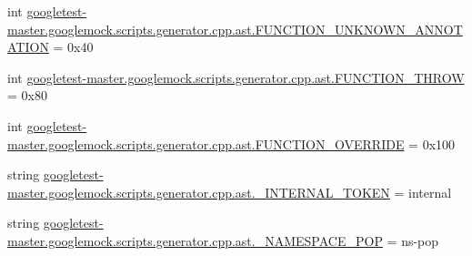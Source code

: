 \begin{DoxyCompactItemize}
\item 
int \mbox{\hyperlink{namespacegoogletest-master_1_1googlemock_1_1scripts_1_1generator_1_1cpp_1_1ast_a25e74e72724f3c7efddb6b23892fd223}{googletest-\/master.\+googlemock.\+scripts.\+generator.\+cpp.\+ast.\+F\+U\+N\+C\+T\+I\+O\+N\+\_\+\+U\+N\+K\+N\+O\+W\+N\+\_\+\+A\+N\+N\+O\+T\+A\+T\+I\+ON}} = 0x40
\item 
int \mbox{\hyperlink{namespacegoogletest-master_1_1googlemock_1_1scripts_1_1generator_1_1cpp_1_1ast_a104c6319c44299d684ee60c8d6879fde}{googletest-\/master.\+googlemock.\+scripts.\+generator.\+cpp.\+ast.\+F\+U\+N\+C\+T\+I\+O\+N\+\_\+\+T\+H\+R\+OW}} = 0x80
\item 
int \mbox{\hyperlink{namespacegoogletest-master_1_1googlemock_1_1scripts_1_1generator_1_1cpp_1_1ast_a9c16f7cb37a67b9647d0168f313fe338}{googletest-\/master.\+googlemock.\+scripts.\+generator.\+cpp.\+ast.\+F\+U\+N\+C\+T\+I\+O\+N\+\_\+\+O\+V\+E\+R\+R\+I\+DE}} = 0x100
\item 
string \mbox{\hyperlink{namespacegoogletest-master_1_1googlemock_1_1scripts_1_1generator_1_1cpp_1_1ast_a648755cf58684fc08b81201e290eaf70}{googletest-\/master.\+googlemock.\+scripts.\+generator.\+cpp.\+ast.\+\_\+\+I\+N\+T\+E\+R\+N\+A\+L\+\_\+\+T\+O\+K\+EN}} = \textquotesingle{}internal\textquotesingle{}
\item 
string \mbox{\hyperlink{namespacegoogletest-master_1_1googlemock_1_1scripts_1_1generator_1_1cpp_1_1ast_abd780ce430bb27a3ecd1990ce7ceecef}{googletest-\/master.\+googlemock.\+scripts.\+generator.\+cpp.\+ast.\+\_\+\+N\+A\+M\+E\+S\+P\+A\+C\+E\+\_\+\+P\+OP}} = \textquotesingle{}ns-\/pop\textquotesingle{}
\end{DoxyCompactItemize}
